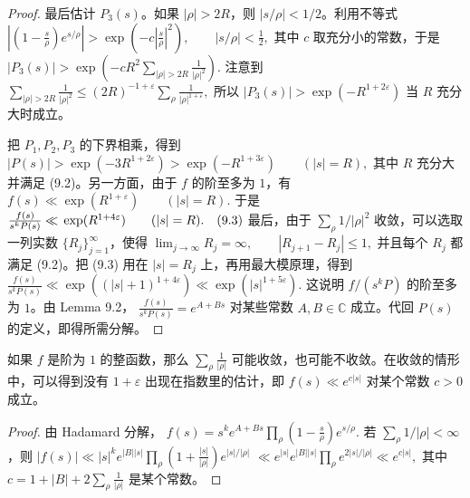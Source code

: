 \begin{proof}
	最后估计 $P_3(s)$。如果 $|\rho|>2R$，则 $|s/\rho|<1/2$。利用不等式
	\(\textstyle \left|\left(1-\frac{s}{\rho}\right)e^{s/\rho}\right| > \exp\left(-c\left|\frac{s}{\rho}\right|^2\right),\allowbreak{} \qquad |s/\rho|<\frac12,\allowbreak{}\)
	其中 $c$ 取充分小的常数，于是
	\(\textstyle |P_3(s)| > \exp\left( -cR^2\sum_{|\rho|>2R}\frac1{|\rho|^2} \right).\)
	注意到
	\(\textstyle \sum_{|\rho|>2R}\frac1{|\rho|^2} \leq\allowbreak{} (2R)^{-1+\allowbreak{}\varepsilon} \sum_\rho\frac1{|\rho|^{1+\allowbreak{}\varepsilon}},\allowbreak{}\)
	所以
	\(\textstyle |P_3(s)| > \exp(-R^{1+\allowbreak{}2\varepsilon})\)
	当 $R$ 充分大时成立。

	把 $P_1,P_2,P_3$ 的下界相乘，得到
	\(\textstyle |P(s)|>\exp(-3R^{1+\allowbreak{}2\varepsilon}) > \exp(-R^{1+\allowbreak{}3\varepsilon}) \qquad (|s|=\allowbreak{}R),\allowbreak{}\)
	其中 $R$ 充分大并满足 (9.2)。另一方面，由于 $f$ 的阶至多为 $1$，有
	\(\textstyle f(s)\ll\allowbreak{} \exp(R^{1+\allowbreak{}\varepsilon}) \qquad (|s|=\allowbreak{}R).\)
	于是
	\(\textstyle \frac{f(s)}{s^kP(s)} \ll\allowbreak{} \exp(R^{1+\allowbreak{}4\varepsilon}) \qquad (|s|=\allowbreak{}R). \quad\textup{(9.3)}\)
	最后，由于 $\sum_\rho 1/|\rho|^2$ 收敛，可以选取一列实数 $\{R_j\}_{j=1}^{\infty}$，使得
	\(\textstyle \lim_{j\to\allowbreak{}\infty}R_j=\allowbreak{}\infty,\allowbreak{} \qquad |R_{j+\allowbreak{}1}-R_j|\leq1,\allowbreak{}\)
	并且每个 $R_j$ 都满足 (9.2)。把 (9.3) 用在 $|s|=R_j$ 上，再用最大模原理，得到
	\(\textstyle \frac{f(s)}{s^kP(s)} \ll\allowbreak{} \exp\left((|s|+\allowbreak{}1)^{1+\allowbreak{}4\varepsilon}\right) \ll\allowbreak{} \exp(|s|^{1+\allowbreak{}5\varepsilon}).\)
	这说明 $f/(s^kP)$ 的阶至多为 $1$。由 Lemma 9.2，
	\(\textstyle \frac{f(s)}{s^kP(s)}=\allowbreak{}e^{A+\allowbreak{}Bs}\)
	对某些常数 $A,B\in\mathbb C$ 成立。代回 $P(s)$ 的定义，即得所需分解。
\end{proof}

\begin{remark}
	如果 $f$ 是阶为 $1$ 的整函数，那么
	\(\textstyle \sum_\rho \frac1{|\rho|}\)
	可能收敛，也可能不收敛。在收敛的情形中，可以得到没有 $1+\varepsilon$ 出现在指数里的估计，即
	\(\textstyle f(s)\ll\allowbreak{} e^{c|s|}\)
	对某个常数 $c>0$ 成立。
\end{remark}

\begin{proof}
	由 Hadamard 分解，
	\(\textstyle f(s)=\allowbreak{}s^k e^{A+\allowbreak{}Bs} \prod_\rho \left(1-\frac{s}{\rho}\right)e^{s/\rho}.\)
	若 $\sum_\rho 1/|\rho|<\infty$，则
	\(\textstyle |f(s)| \ll\allowbreak{} |s|^k e^{|B||s|} \prod_\rho \left(1+\allowbreak{}\frac{|s|}{|\rho|}\right)e^{|s|/|\rho|}\) \(\textstyle \ll\allowbreak{} e^{|s|}e^{|B||s|} \prod_\rho e^{2|s|/|\rho|} \ll\allowbreak{} e^{c|s|},\allowbreak{}\)
	其中
	\(\textstyle c=\allowbreak{}1+\allowbreak{}|B|+\allowbreak{}2\sum_\rho\frac1{|\rho|}\)
	是某个常数。
\end{proof}

